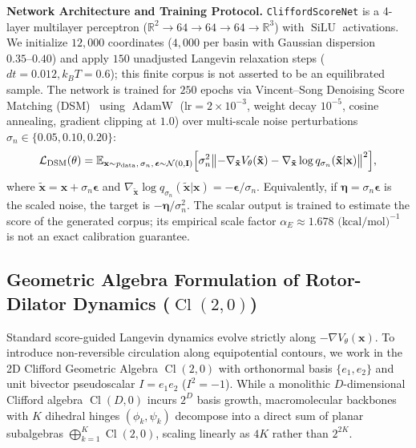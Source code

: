 \documentclass{article}
\begin{document}
\textbf{Network Architecture and Training Protocol.} \texttt{CliffordScoreNet} is a 4-layer multilayer perceptron ($\mathbb{R}^2 \to 64 \to 64 \to 64 \to \mathbb{R}^3$) with $\operatorname{SiLU}$ activations. We initialize $12{,}000$ coordinates ($4{,}000$ per basin with Gaussian dispersion $0.35\text{--}0.40$) and apply $150$ unadjusted Langevin relaxation steps ($dt = 0.012, k_B T = 0.6$); this finite corpus is not asserted to be an equilibrated sample. The network is trained for $250$ epochs via Vincent--Song Denoising Score Matching (DSM)~\citep{song2020score} using $\operatorname{AdamW}$ ($\text{lr} = 2 \times 10^{-3}$, weight decay $10^{-5}$, cosine annealing, gradient clipping at $1.0$) over multi-scale noise perturbations $\sigma_n \in \{0.05, 0.10, 0.20\}$:
\begin{equation}
\mathcal{L}_{\text{DSM}}(\theta) = \mathbb{E}_{\mathbf{x} \sim p_{\text{data}},\, \sigma_n,\, \boldsymbol{\epsilon} \sim \mathcal{N}(0, \mathbf{I})}\Bigl[ \sigma_n^2 \bigl\| -\nabla_{\mathbf{\tilde{x}}} V_\theta(\mathbf{\tilde{x}}) - \nabla_{\mathbf{\tilde{x}}} \log q_{\sigma_n}(\mathbf{\tilde{x}}|\mathbf{x}) \bigr\|^2 \Bigr],
\label{eq:score_matching}
\end{equation}
where $\mathbf{\tilde{x}} = \mathbf{x} + \sigma_n \boldsymbol{\epsilon}$ and $\nabla_{\mathbf{\tilde{x}}} \log q_{\sigma_n}(\mathbf{\tilde{x}}|\mathbf{x}) = -\boldsymbol{\epsilon}/\sigma_n$. Equivalently, if $\boldsymbol{\eta}=\sigma_n\boldsymbol{\epsilon}$ is the scaled noise, the target is $-\boldsymbol{\eta}/\sigma_n^2$. The scalar output is trained to estimate the score of the generated corpus; its empirical scale factor $\alpha_E \approx 1.678\text{ (kcal/mol)}^{-1}$ is not an exact calibration guarantee.

\subsection{Geometric Algebra Formulation of Rotor-Dilator Dynamics ($\operatorname{Cl}(2,0)$)}

Standard score-guided Langevin dynamics evolve strictly along $-\nabla V_\theta(\mathbf{x})$. To introduce non-reversible circulation along equipotential contours, we work in the 2D Clifford Geometric Algebra $\operatorname{Cl}(2,0)$ with orthonormal basis $\{e_1, e_2\}$ and unit bivector pseudoscalar $I = e_1 e_2$ ($I^2 = -1$). While a monolithic $D$-dimensional Clifford algebra $\operatorname{Cl}(D,0)$ incurs $2^D$ basis growth, macromolecular backbones with $K$ dihedral hinges $(\phi_k, \psi_k)$ decompose into a direct sum of planar subalgebras $\bigoplus_{k=1}^K \operatorname{Cl}(2,0)$, scaling linearly as $4K$ rather than $2^{2K}$.
\end{document}
